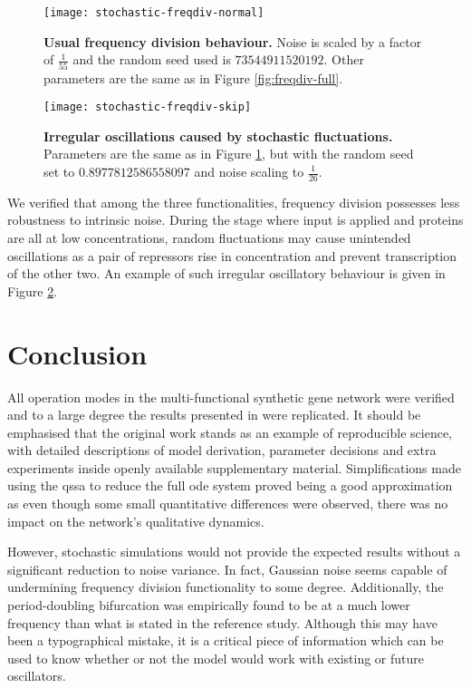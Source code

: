     \begin{figure}[!htb]
      \centering
      \texttt{[image: stochastic-freqdiv-normal]}
      \caption{\textbf{Usual frequency division behaviour.} Noise is scaled by a factor of $\frac{1}{55}$ and the random seed used is $73544911520192$. Other parameters are the same as in Figure \ref{fig:freqdiv-full}.}
      \label{fig:stochastic-freqdiv-normal}
    \end{figure}
    \begin{figure}[!htb]
      \centering
      \texttt{[image: stochastic-freqdiv-skip]}
      \caption{\textbf{Irregular oscillations caused by stochastic fluctuations.} Parameters are the same as in Figure \ref{fig:stochastic-freqdiv-normal}, but with the random seed set to $0.8977812586558097$ and noise scaling to $\frac{1}{26}$.}
      \label{fig:stochastic-freqdiv-skip}
    \end{figure}

    We verified that among the three functionalities, frequency division possesses less robustness to intrinsic noise.
    During the stage where input is applied and proteins are all at low concentrations, random fluctuations may cause unintended oscillations as a pair of repressors rise in concentration and prevent transcription of the other two.
    An example of such irregular oscillatory behaviour is given in Figure \ref{fig:stochastic-freqdiv-skip}.


\section{Conclusion}

  All operation modes in the multi-functional synthetic gene network were verified and to a large degree the results presented in \cite{multif} were replicated.
  It should be emphasised that the original work stands as an example of reproducible science, with detailed descriptions of model derivation, parameter decisions and extra experiments inside openly available supplementary material.
  Simplifications made using the \ac{qssa} to reduce the full \ac{ode} system proved being a good approximation as even though some small quantitative differences were observed, there was no impact on the network's qualitative dynamics.

  However, stochastic simulations would not provide the expected results without a significant reduction to noise variance.
  In fact, Gaussian noise seems capable of undermining frequency division functionality to some degree.
  Additionally, the period-doubling bifurcation was empirically found to be at a much lower frequency than what is stated in the reference study.
  Although this may have been a typographical mistake, it is a critical piece of information which can be used to know whether or not the model would work with existing or future oscillators.

